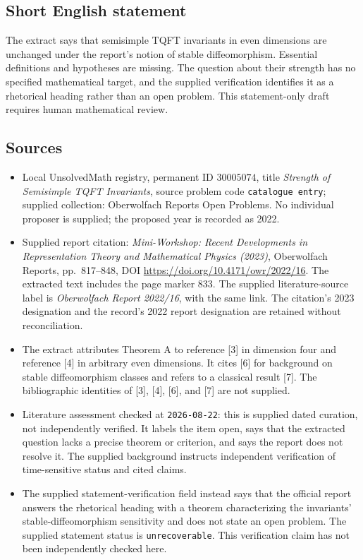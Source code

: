 \documentclass[11pt]{article}
\begin{document}
\subsection{Short English statement}
The extract says that semisimple TQFT invariants in even dimensions are unchanged under the report's notion of stable diffeomorphism. Essential definitions and hypotheses are missing. The question about their strength has no specified mathematical target, and the supplied verification identifies it as a rhetorical heading rather than an open problem. This statement-only draft requires human mathematical review.
\subsection{Sources}
\begin{itemize}
\item Local UnsolvedMath registry, permanent ID \(30005074\), title \emph{Strength of Semisimple TQFT Invariants}, source problem code \texttt{catalogue entry}; supplied collection: Oberwolfach Reports Open Problems. No individual proposer is supplied; the proposed year is recorded as 2022.
\item Supplied report citation: \emph{Mini-Workshop: Recent Developments in Representation Theory and Mathematical Physics (2023)}, Oberwolfach Reports, pp.\ 817--848, DOI \url{https://doi.org/10.4171/owr/2022/16}. The extracted text includes the page marker 833. The supplied literature-source label is \emph{Oberwolfach Report 2022/16}, with the same link. The citation's 2023 designation and the record's 2022 report designation are retained without reconciliation.
\item The extract attributes Theorem A to reference [3] in dimension four and reference [4] in arbitrary even dimensions. It cites [6] for background on stable diffeomorphism classes and refers to a classical result [7]. The bibliographic identities of [3], [4], [6], and [7] are not supplied.
\item Literature assessment checked at \texttt{2026-08-22}: this is supplied dated curation, not independently verified. It labels the item open, says that the extracted question lacks a precise theorem or criterion, and says the report does not resolve it. The supplied background instructs independent verification of time-sensitive status and cited claims.
\item The supplied statement-verification field instead says that the official report answers the rhetorical heading with a theorem characterizing the invariants' stable-diffeomorphism sensitivity and does not state an open problem. The supplied statement status is \texttt{unrecoverable}. This verification claim has not been independently checked here.
\end{itemize}
\end{document}
